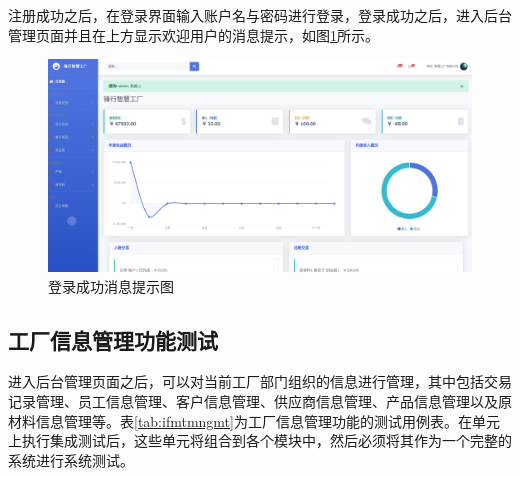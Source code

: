 注册成功之后，在登录界面输入账户名与密码进行登录，登录成功之后，进入后台管理页面并且在上方显示欢迎用户的消息提示，如图\ref{fig:lgsccs}所示。

\begin{figure}[H]
    \centering
    \includegraphics[width=.65\textwidth]{figures/6loginsuscess.png}
    \caption{登录成功消息提示图}
    \label{fig:lgsccs}
\end{figure}

\subsection{工厂信息管理功能测试}

进入后台管理页面之后，可以对当前工厂部门组织的信息进行管理，其中包括交易记录管理、员工信息管理、客户信息管理、供应商信息管理、产品信息管理以及原材料信息管理等。表\ref{tab:ifmtmngmt}为工厂信息管理功能的测试用例表。在单元上执行集成测试后，这些单元将组合到各个模块中，然后必须将其作为一个完整的系统进行系统测试。

